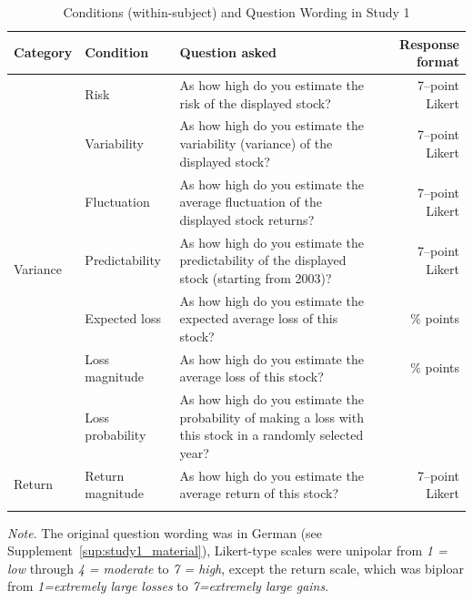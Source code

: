 \documentclass[a4paper,man, natbib,floatsintext]{apa6} %
\begin{document}
\begin{table}[hb!]
\centering
\onehalfspacing
\begin{threeparttable}
\caption{Conditions (within-subject) and Question Wording in Study 1}
\small
\label{table:Questions}
\begin{tabularx}{\columnwidth}{p{1.7cm}p{2.9cm}p{7cm}r{0.5cm}}
Category & Condition & Question asked & Response format \\
\toprule
\multirow{7}{*}{Variance} & Risk & As how high do you estimate the risk of the displayed stock? & 7--point Likert \\
& Variability & As how high do you estimate the variability (variance) of the displayed stock? & 7--point Likert \\
&  Fluctuation & As how high do you estimate the average fluctuation of the displayed stock returns? & 7--point Likert \\ 
 & Predictability & As how high do you estimate the predictability of the displayed stock (starting from 2003)? & 7--point Likert \\
 \cmidrule{2-4}
\multirow{7}{*}{Loss} & Expected loss & As how high do you estimate the expected average loss of this stock? &  $\%$ points \\
     & Loss magnitude & As how high do you estimate the average loss of this stock? & $\%$ points\\
     & Loss probability & As how high do you estimate the probability of making a loss with this stock in a randomly selected year?\\
 \cmidrule{2-4}
\multirow{1}{*}{Return} & Return magnitude & As how high do you estimate the average return of this stock? & 7--point Likert \\
\bottomrule
\\
\end{tabularx}
\begin{tablenotes}
\small
\item
 \textit{Note}. The original question wording was in German (see Supplement~\ref{sup:study1_material}), Likert-type scales were unipolar from \textit{1 = low} through \textit{4 = moderate} to \textit{7 = high}, except the return scale, which was biploar from \textit{1=extremely large losses} to \textit{7=extremely large gains}.

\end{tablenotes}
\end{threeparttable}
\end{table}
\end{document}
